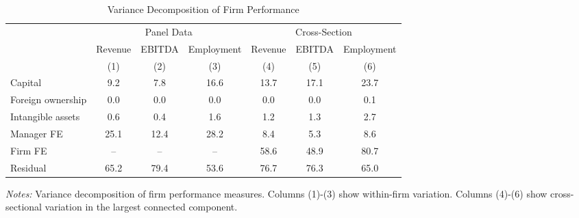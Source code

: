 \begin{table}[htbp]
\centering
\caption{Variance Decomposition of Firm Performance}
\label{tab:variance_decomposition}
\begin{tabular}{l*{6}{c}}
\toprule
 & \multicolumn{3}{c}{Panel Data} & \multicolumn{3}{c}{Cross-Section} \\
\cmidrule(lr){2-4} \cmidrule(lr){5-7}
 & Revenue & EBITDA & Employment & Revenue & EBITDA & Employment \\
 & (1) & (2) & (3) & (4) & (5) & (6) \\
\midrule
Capital &   9.2 &   7.8 &  16.6 &  13.7 &  17.1 &  23.7 \\
Foreign ownership &   0.0 &   0.0 &   0.0 &   0.0 &   0.0 &   0.1 \\
Intangible assets &   0.6 &   0.4 &   1.6 &   1.2 &   1.3 &   2.7 \\
Manager FE &  25.1 &  12.4 &  28.2 &   8.4 &   5.3 &   8.6 \\
Firm FE & -- & -- & -- &  58.6 &  48.9 &  80.7 \\
Residual &  65.2 &  79.4 &  53.6 &  76.7 &  76.3 &  65.0 \\
\bottomrule
\end{tabular}
\begin{minipage}{14cm}
\footnotesize
\textit{Notes:} Variance decomposition of firm performance measures. Columns (1)-(3) show within-firm variation. Columns (4)-(6) show cross-sectional variation in the largest connected component. \end{minipage}
\end{table}
